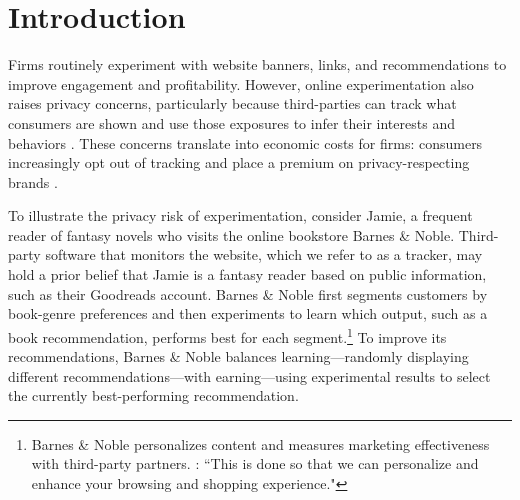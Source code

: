 \documentclass[mksc,nonblindrev]{informs3}
\begin{document}


\maketitle

\vspace{-1.5cm}
\section{Introduction}
Firms routinely experiment with website banners, links, and recommendations to improve engagement and profitability. However, online experimentation also raises privacy concerns, particularly because third-parties can track what consumers are shown and use those exposures to infer their interests and behaviors \citep{goldfarb_tucker_2011,Summers_2016, Kim_2018,shaddy_2026}. These concerns translate into economic costs for firms: consumers increasingly opt out of tracking \citep{Tucker_2014, Johnson_2020, Pengyuan_2024, MILLER2024241} and place a premium on privacy-respecting brands \citep{Jordan_2025}.

To illustrate the privacy risk of experimentation, consider Jamie, a frequent reader of fantasy novels who visits the online bookstore Barnes \& Noble. Third-party software that monitors the website, which we refer to as a tracker, may hold a prior belief that Jamie is a fantasy reader based on public information, such as their Goodreads account. Barnes \& Noble first segments customers by book-genre preferences and then experiments to learn which output, such as a book recommendation, performs best for each segment.\footnote{Barnes \& Noble personalizes content and measures marketing effectiveness with third-party partners. \cite{BarnesNobleCookiePolicy}: ``This is done so that we can personalize and enhance your browsing and shopping experience."} To improve its recommendations, Barnes \& Noble balances learning—randomly displaying different recommendations—with earning—using experimental results to select the currently best-performing recommendation.
\end{document}
